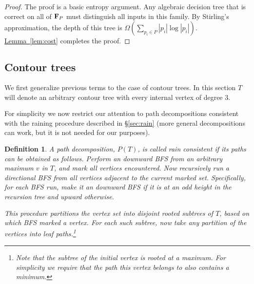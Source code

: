 \documentclass[11pt]{article}
\newtheorem{definition}[theorem]{Definition}
\theoremstyle{definition}
\newcommand{\bF}{{\bf F}}
\newcommand{\cJ}{{\cal J}}
\newcommand{\Sec}[1]{\hyperref[sec:#1]{\S\ref*{sec:#1}}} %
\newcommand{\Lem}[1]{\hyperref[lem:#1]{Lemma~\ref*{lem:#1}}} %
\newcommand{\cost}{\mathop{cost}}
\newcommand{\jc}{\cJ_C}
\begin{document}
\begin{proof}
The proof is a basic entropy argument. Any algebraic decision tree that is correct on all of $\bF_P$
must distinguish all inputs in this family. By Stirling's approximation, the depth of this tree is $\Omega(\sum_{p_i\in P} |p_i|\log|p_i|)$.
\Lem{cost} completes the proof.
%
%
\end{proof}

\subsection{Contour trees}
We first generalize previous terms to the case of contour trees.
In this section $T$ will denote an arbitrary contour tree with every internal vertex of degree $3$.

For simplicity we now restrict our attention to path decompositions 
consistent with the raining procedure described in \Sec{rain} 
(more general decompositions can work, but it is not needed for our purposes).

\begin{definition}
\label{def:path2} A path decomposition, $P(T)$, is called \emph{rain consistent} if its paths can be obtained as follows.
Perform an downward BFS from an arbitrary maximum $v$ in $T$, and mark all vertices encountered.  
Now recursively run a directional BFS from all vertices adjacent to the current marked set.  
Specifically, for each BFS run, make it an downward BFS if it is at an odd height in the recursion tree and upward otherwise.  

This procedure partitions the vertex set into disjoint rooted subtrees of $T$, based on which BFS marked a vertex.  
For each such subtree, now take any partition of the vertices into leaf paths.\footnote{Note that the subtree  
of the initial vertex is rooted at a maximum.  For simplicity we require that the path this vertex belongs to 
also contains a minimum.}
\end{definition}
\end{document}

